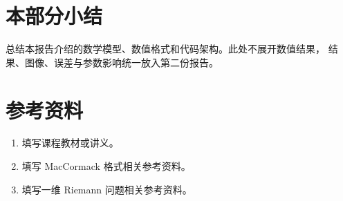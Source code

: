 \section{本部分小结}

总结本报告介绍的数学模型、数值格式和代码架构。此处不展开数值结果，
结果、图像、误差与参数影响统一放入第二份报告。

\section*{参考资料}

\begin{enumerate}[leftmargin=2em]
    \item 填写课程教材或讲义。
    \item 填写 MacCormack 格式相关参考资料。
    \item 填写一维 Riemann 问题相关参考资料。
\end{enumerate}
